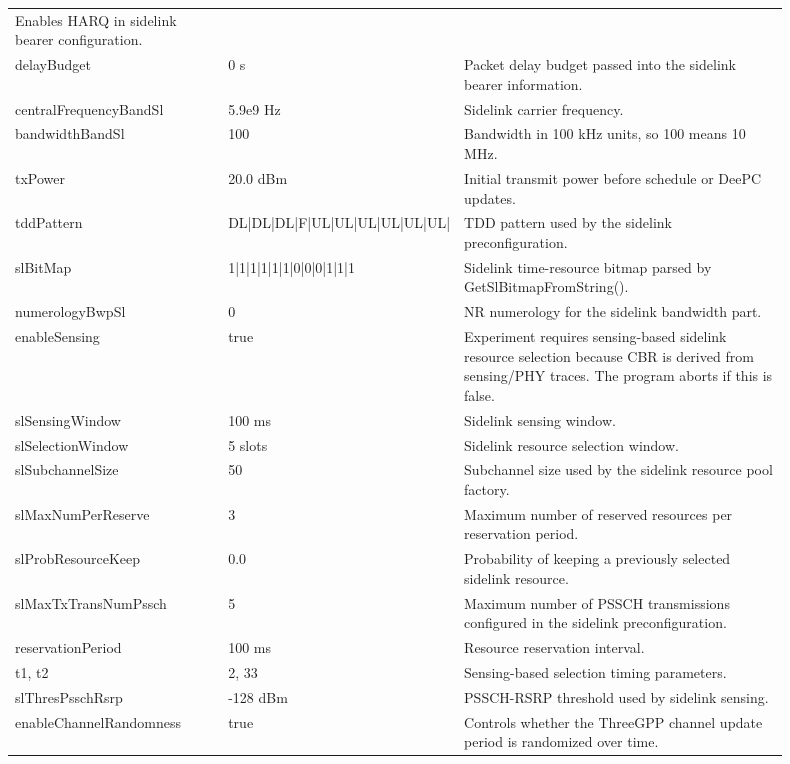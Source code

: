 \documentclass[11pt]{article}
\DeclareRobustCommand{\code}[1]{\texttt{\detokenize{#1}}}
\def\code#1{#1}%
\begin{document}
\begin{center}
\begin{longtable}{L{0.28\linewidth}L{0.18\linewidth}L{0.44\linewidth}}
Enables HARQ in sidelink bearer configuration. \\
\code{delayBudget} & \code{0 s} &
Packet delay budget passed into the sidelink bearer information. \\
\code{centralFrequencyBandSl} & \code{5.9e9 Hz} &
Sidelink carrier frequency. \\
\code{bandwidthBandSl} & \code{100} &
Bandwidth in 100 kHz units, so 100 means 10 MHz. \\
\code{txPower} & \code{20.0 dBm} &
Initial transmit power before schedule or DeePC updates. \\
\code{tddPattern} & \code{DL|DL|DL|F|UL|UL|UL|UL|UL|UL|} &
TDD pattern used by the sidelink preconfiguration. \\
\code{slBitMap} & \code{1|1|1|1|1|1|0|0|0|1|1|1} &
Sidelink time-resource bitmap parsed by \code{GetSlBitmapFromString()}. \\
\code{numerologyBwpSl} & \code{0} &
NR numerology for the sidelink bandwidth part. \\
\code{enableSensing} & \code{true} &
Experiment requires sensing-based sidelink resource selection because CBR is
derived from sensing/PHY traces.  The program aborts if this is false. \\
\code{slSensingWindow} & \code{100 ms} &
Sidelink sensing window. \\
\code{slSelectionWindow} & \code{5 slots} &
Sidelink resource selection window. \\
\code{slSubchannelSize} & \code{50} &
Subchannel size used by the sidelink resource pool factory. \\
\code{slMaxNumPerReserve} & \code{3} &
Maximum number of reserved resources per reservation period. \\
\code{slProbResourceKeep} & \code{0.0} &
Probability of keeping a previously selected sidelink resource. \\
\code{slMaxTxTransNumPssch} & \code{5} &
Maximum number of PSSCH transmissions configured in the sidelink preconfiguration. \\
\code{reservationPeriod} & \code{100 ms} &
Resource reservation interval. \\
\code{t1}, \code{t2} & \code{2}, \code{33} &
Sensing-based selection timing parameters. \\
\code{slThresPsschRsrp} & \code{-128 dBm} &
PSSCH-RSRP threshold used by sidelink sensing. \\
\code{enableChannelRandomness} & \code{true} &
Controls whether the ThreeGPP channel update period is randomized over time. \\

\end{longtable}
\end{center}
\end{document}
